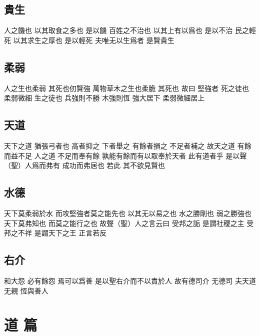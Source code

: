 \documentclass[a5paper,zihao=-4,oneside,UTF8]{ctexart}
\begin{document}
\subsection{貴生}



人之饑也 以其取食之多也 是以饑 
百姓之不治也 以其上有以爲也 是以不治 
民之輕死 以其求生之厚也 是以輕死 
夫唯无以生爲者 是賢貴生 



\subsection{柔弱}



人之生也柔弱 其死也仞賢強 萬物草木之生也柔脆 其死也 
故曰 堅強者 死之徒也 柔弱微細 生之徒也 
兵強則不勝 木強則恆 
強大居下 柔弱微細居上 



\subsection{天道}



天下之道 猶張弓者也 高者抑之 下者舉之 有餘者損之 不足者補之 
故天之道 有餘而益不足 人之道 不足而奉有餘 
孰能有餘而有以取奉於天者 此有道者乎 
是以聲（聖）人爲而弗有 成功而弗居也 若此 其不欲見賢也 



\subsection{水德}



天下莫柔弱於水 而攻堅強者莫之能先也 以其无以易之也 
水之勝剛也 弱之勝強也 天下莫弗知也 而莫之能行之也 
故聲（聖）人之言云曰 受邦之詬 是謂社稷之主 受邦之不祥 是謂天下之王 
正言若反 



\subsection{右介}



和大怨 必有餘怨 焉可以爲善 
是以聖右介而不以責於人 
故有德司介 无德司 
夫天道无親 恆與善人


\section{道 篇}
\end{document}
